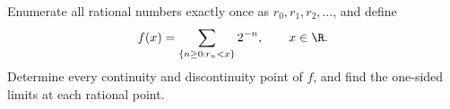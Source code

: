 Enumerate all rational numbers exactly once as $r_0,r_1,r_2,\ldots$, and define
\[
 f(x)=\sum_{\{n\ge0:r_n<x\}}2^{-n},\qquad x\in\R.
\]
Determine every continuity and discontinuity point of $f$, and find the one-sided limits at each rational point.
